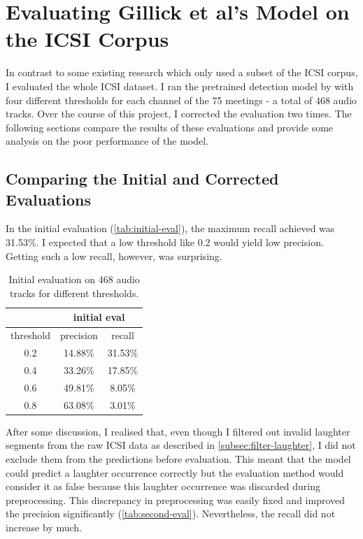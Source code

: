 \documentclass[bsc,frontabs,parskip,deptreport]{infthesis}
\begin{document}
\section{Evaluating Gillick et al's Model on the ICSI Corpus}
In contrast to some existing research \citep{kennedy2004laughter, knox2006automatic} which only used a subset of the ICSI corpus, I evaluated the whole ICSI dataset.
I ran the pretrained detection model by \citet{gillick2021robust} with four different thresholds for each channel of the 75 meetings - a total of 468 audio tracks. 
Over the course of this project, I corrected the evaluation two times.
The following sections compare the results of these evaluations and provide some analysis on the poor performance of the model.

\subsection{Comparing the Initial and Corrected Evaluations}
In the initial evaluation (\autoref{tab:initial-eval}), the maximum recall achieved was 31.53\%. I expected that a low threshold like 0.2 would yield low precision. Getting such a low recall, however, was surprising. 
\begin{table}[h!]
    \centering
    \begin{tabular}{|c|c|c|}
    \hline
    & \multicolumn{2}{|c|}{initial eval} \\ 
    \hline 
    threshold & precision & recall \\
    \hline
        0.2 &  14.88\% & 31.53\% \\ 
        0.4 &  33.26\% & 17.85\% \\
        0.6 &  49.81\% & 8.05\%  \\
        0.8 &  63.08\% & 3.01\%  \\
     \hline
    \end{tabular}
    \caption{Initial evaluation on 468 audio tracks for different thresholds.}
    \label{tab:initial-eval}
\end{table}



After some discussion, I realised that, even though I filtered out invalid laughter segments from the raw ICSI data as described in \autoref{subsec:filter-laughter}, I did not exclude them from the predictions before evaluation. 
This meant that the model could predict a laughter occurrence correctly but the evaluation method would consider it as false because this laughter occurrence was discarded during preprocessing.
This discrepancy in preprocessing was easily fixed and improved the precision significantly (\autoref{tab:second-eval}). Nevertheless, the recall did not increase by much. 
\end{document}
